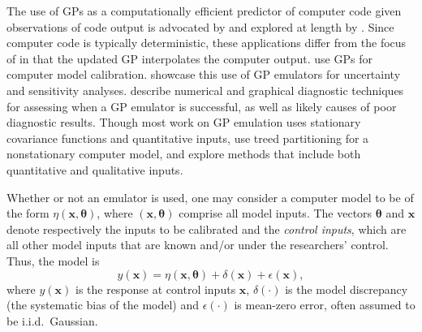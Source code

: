 \documentclass[12pt]{article}
\begin{document}
%
The use of GPs as a computationally efficient predictor of computer code given observations of code output is advocated by \cite{Sacks1989} and explored at length by \cite{Santner2003a}.
%
Since computer code is typically deterministic, these applications differ from the focus of \cite{OHagan1978} in that the updated GP interpolates the computer output. 
%
\cite{Kennedy2001} use GPs for computer model calibration. 
%
\cite{Kennedy2006} showcase this use of GP emulators for uncertainty and sensitivity analyses. 
%
\cite{Bastos2009} describe numerical and graphical diagnostic techniques for assessing when a GP emulator is successful, as well as likely causes of poor diagnostic results. 
%
Though most work on GP emulation uses stationary covariance functions 
and quantitative inputs, 
%
\cite{Gramacy2008} use treed partitioning for a nonstationary computer model, and
%
\cite{Qian2008} explore methods that include both quantitative and qualitative inputs.
%

%
Whether or not an emulator is used, one may consider a computer model to be of the form $\eta(\mathbf x,\boldsymbol \theta)$, where $(\mathbf x,\boldsymbol \theta)$ comprise all model inputs. 
%
The vectors $\boldsymbol \theta$ and $\mathbf x$ denote respectively the inputs to be calibrated and the \emph{control inputs}, which are all other model inputs that are known and/or under the researchers' control. 
%
%
%
Thus, the model is
%
\begin{equation} \label{eq:model_gen}
y(\mathbf x)=\eta(\mathbf x,\boldsymbol \theta) + \delta(\mathbf x)+\epsilon(\mathbf x),
\end{equation} 
%
where $y(\mathbf x)$ is the response at control inputs $\mathbf x$, $\delta(\cdot)$ is the model discrepancy (the systematic bias of the model) and $\epsilon(\cdot)$ is mean-zero error, often assumed to be i.i.d.\ Gaussian. 
%
\end{document}
